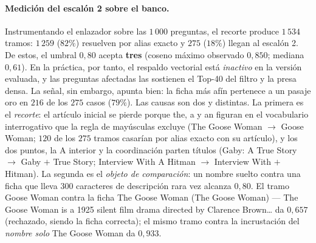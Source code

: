 \documentclass[11pt,a4paper]{article}
\begin{document}
\paragraph{Medición del escalón 2 sobre el banco.}
Instrumentando el enlazador sobre las $1\,000$ preguntas, el recorte
produce $1\,534$ tramos: $1\,259$ ($82\%$) resuelven por alias exacto y
$275$ ($18\%$) llegan al escalón 2. De estos, el umbral $0{,}80$ acepta
\textbf{tres} (coseno máximo observado $0{,}850$; mediana $0{,}61$). En
la práctica, por tanto, el respaldo vectorial está \emph{inactivo} en la
versión evaluada, y las preguntas afectadas las sostienen el Top-40 del
filtro y la presa densa. La señal, sin embargo, apunta bien: la ficha más
afín pertenece a un pasaje oro en $216$ de los $275$ casos ($79\%$). Las
causas son dos y distintas. La primera es el \emph{recorte}: el artículo
inicial se pierde porque \guillemotleft{}the\guillemotright{}, \guillemotleft{}a\guillemotright{} y \guillemotleft{}an\guillemotright{} figuran en el
vocabulario interrogativo que la regla de mayúsculas excluye
(\guillemotleft{}The Goose Woman\guillemotright{} $\to$ \guillemotleft{}Goose Woman\guillemotright{}; $120$ de los $275$ tramos
casarían por alias exacto con su artículo), y los dos puntos, la \guillemotleft{}A\guillemotright{}
interior y la coordinación parten títulos (\guillemotleft{}Gaby: A True Story\guillemotright{}
$\to$ \guillemotleft{}Gaby\guillemotright{} $+$ \guillemotleft{}True Story\guillemotright{}; \guillemotleft{}Interview With A Hitman\guillemotright{}
$\to$ \guillemotleft{}Interview With\guillemotright{} $+$ \guillemotleft{}Hitman\guillemotright{}). La segunda es el
\emph{objeto de comparación}: un nombre suelto contra una ficha que lleva
$300$ caracteres de descripción rara vez alcanza $0{,}80$. El tramo
\guillemotleft{}Goose Woman\guillemotright{} contra la ficha \guillemotleft{}The Goose Woman (The Goose Woman)
--- The Goose Woman is a 1925 silent film drama directed by Clarence
Brown\dots\guillemotright{} da $0{,}657$ (rechazado, siendo la ficha correcta); el mismo
tramo contra la incrustación del \emph{nombre solo} \guillemotleft{}The Goose
Woman\guillemotright{} da $0{,}933$.
\end{document}

